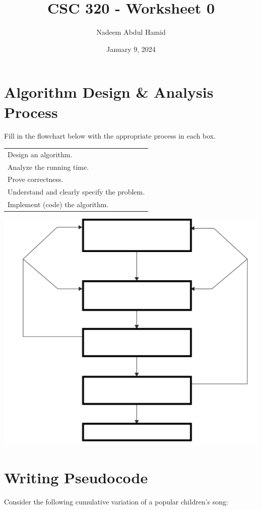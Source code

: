 \documentclass[12pt]{article}
\title{CSC 320 - Worksheet 0}
\author{Nadeem Abdul Hamid}
\date{January 9, 2024}
\begin{document}
\section{Algorithm Design \& Analysis Process}

Fill in the flowchart below with the appropriate process in each box.

\begin{table}[h]
\begin{tabular}{|l|}
    \hline
    Design an algorithm.\\
    Analyze the running time.\\
    Prove correctness.\\
    Understand and clearly specify the problem.\\
    Implement (code) the algorithm.\\
    \hline
\end{tabular}
\end{table}
    
\includegraphics[width=.75\linewidth]{w00-flowchart.png}


\clearpage
\section{Writing Pseudocode}

Consider the following cumulative variation of a popular children's song:
\end{document}
